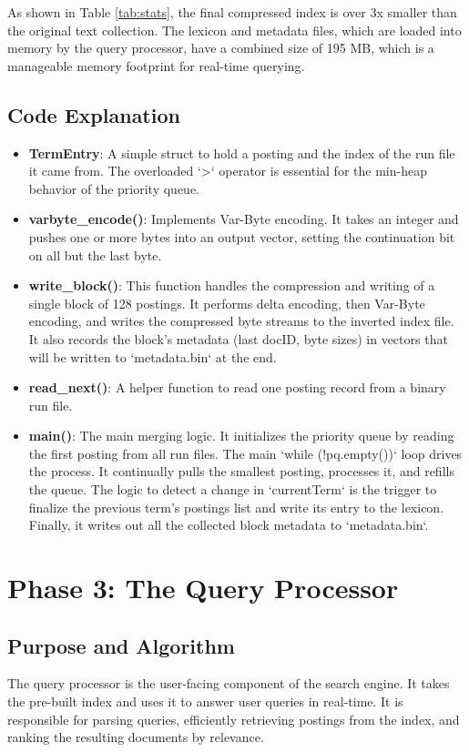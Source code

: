 \documentclass{article}
\begin{document}
As shown in Table \ref{tab:stats}, the final compressed index is over 3x smaller than the original text collection. The lexicon and metadata files, which are loaded into memory by the query processor, have a combined size of 195 MB, which is a manageable memory footprint for real-time querying.

\subsection{Code Explanation}
\begin{itemize}
    \item \textbf{TermEntry}: A simple struct to hold a posting and the index of the run file it came from. The overloaded `>` operator is essential for the min-heap behavior of the priority queue.
    \item \textbf{varbyte\_encode()}: Implements Var-Byte encoding. It takes an integer and pushes one or more bytes into an output vector, setting the continuation bit on all but the last byte.
    \item \textbf{write\_block()}: This function handles the compression and writing of a single block of 128 postings. It performs delta encoding, then Var-Byte encoding, and writes the compressed byte streams to the inverted index file. It also records the block's metadata (last docID, byte sizes) in vectors that will be written to `metadata.bin` at the end.
    \item \textbf{read\_next()}: A helper function to read one posting record from a binary run file.
    \item \textbf{main()}: The main merging logic. It initializes the priority queue by reading the first posting from all run files. The main `while (!pq.empty())` loop drives the process. It continually pulls the smallest posting, processes it, and refills the queue. The logic to detect a change in `currentTerm` is the trigger to finalize the previous term's postings list and write its entry to the lexicon. Finally, it writes out all the collected block metadata to `metadata.bin`.
\end{itemize}


\section{Phase 3: The Query Processor}
\subsection{Purpose and Algorithm}
The query processor is the user-facing component of the search engine. It takes the pre-built index and uses it to answer user queries in real-time. It is responsible for parsing queries, efficiently retrieving postings from the index, and ranking the resulting documents by relevance.
\end{document}
